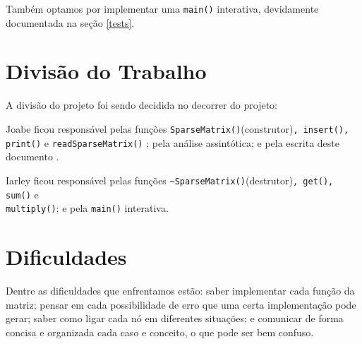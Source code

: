 \documentclass[12pt, letterpaper]{article}
\begin{document}
		Também optamos por implementar uma \verb|main()| interativa, devidamente documentada na seção \ref{tests}.
	\section{Divisão do Trabalho} \label{div}
		A divisão do projeto foi sendo decidida no decorrer do projeto:
		
		Joabe ficou responsável pelas funções \verb|SparseMatrix()|(construtor)\verb|, insert(), print()| e \verb|readSparseMatrix()| \cite{ArquivosCFB2017, CppFilesShmeowlex2021}; pela análise assintótica; e pela escrita deste documento \cite{LearnOverleaf2022}.

		Iarley ficou responsável pelas funções \verb|~SparseMatrix()|(destrutor)\verb|, get(), sum()| e \\ \verb|multiply()|; e pela \verb|main()| interativa.
	\section{Dificuldades} \label{difc}
		Dentre as dificuldades que enfrentamos estão: saber implementar cada função da matriz; pensar em cada possibilidade de erro que uma certa implementação pode gerar; saber como ligar cada nó em diferentes situações; e comunicar de forma concisa e organizada cada caso e conceito, o que pode ser bem confuso.
\end{document}
